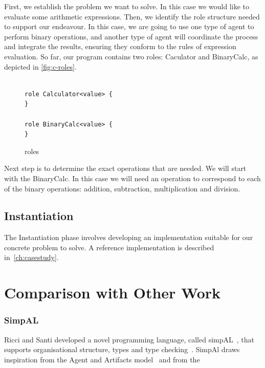 \documentclass[a4paper,12pt,oneside,fleqn]{book} %
\newcommand{\todo}[1]{[\textcolor{red}{TODO}: #1]}
\begin{document}
{First, we establish the problem we want to solve. In this case we would
like to evaluate some arithmetic expressions. Then, we identify the role
structure needed to support our endeavour. In this case, we are going to
use one type of agent to perform binary operations, and another type of
agent will coordinate the process and integrate the results, ensuring they
conform to the rules of expression evaluation. So far, our program contains
two roles: Caculator and BinaryCalc, as depicted in \autoref{fig:c-roles}.

\begin{figure}\footnotesize %
\begin{verbatim}

role Calculator<value> {
}

role BinaryCalc<value> {
}

\end{verbatim}
\caption{roles}
\label{fig:c-roles}
\end{figure} %

Next step is to determine the exact operations that are needed. We will
start with the BinaryCalc. In this case we will need an operation to
correspond to each of the binary operations: addition, subtraction,
multiplication and division.


\subsection{Instantiation} %
The Instantiation phase involves developing an implementation suitable for
our concrete problem to solve. A reference implementation is described
in~\autoref{ch:casestudy}.

\section{Comparison with Other Work}\label{ch:related} %

\subsubsection{SimpAL} %
Ricci  and Santi developed a novel programming language, called
simpAL~\cite{DBLP:conf/oopsla/RicciS11,DBLP:conf/oopsla/RicciS12}, that
supports organisational structure, types and type
checking~\cite{DBLP:conf/promas/RicciS12}. SimpAl draws inspiration from
the Agent and Artifacts model~\cite{DBLP:conf/atal/RicciVO07} and from the

}
\end{document}
